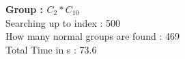 \textbf{Group : $C_2*C_{10}$}\\
Searching up to index : 500\\
How many normal groups are found : 469\\
Total Time in s : 73.6\\
